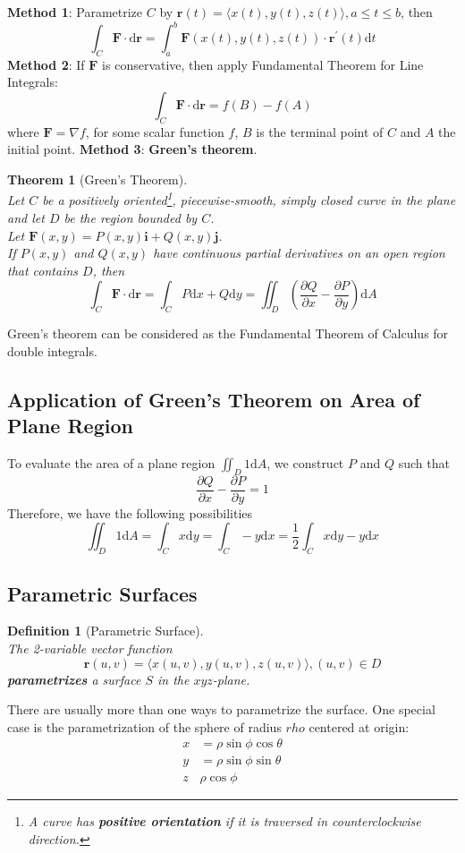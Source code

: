 \documentclass[12pt]{article}
\newtheorem{definition}{Definition}[section]
\newtheorem{theorem}{Theorem}[section]
\theoremstyle{definition}
\newcommand{\diff}{\mathrm{d}}
\begin{document}
\textbf{Method 1}: Parametrize $C$ by $\mathbf{r}(t) = \langle x(t), y(t), z(t)\rangle, a\leq t\leq b$, then
\[
\int_C\mathbf{F}\cdot \diff\mathbf{r} = \int_a^b\mathbf{F}(x(t),y(t),z(t))\cdot \mathbf{r}^\prime(t)\diff t
\]
\textbf{Method 2}: If $\mathbf{F}$ is conservative, then apply Fundamental Theorem for  Line Integrals:
\[
\int_C\mathbf{F}\cdot\diff\mathbf{r} = f(B)-f(A)
\]
where $\mathbf{F} = \nabla f$, for some scalar function $f$, $B$ is the terminal point of $C$ and $A$ the initial point.
\textbf{Method 3}: \textbf{Green's theorem}. 
\begin{theorem}[Green's Theorem]
\hfill\\\normalfont Let $C$ be a positively oriented\footnote{A curve has \textbf{positive orientation} if it is traversed in counterclockwise direction.}, piecewise-smooth, simply closed curve in the plane and let $D$ be the region bounded by $C$.\\Let $\mathbf{F}(x,y)= P(x,y)\mathbf{i}+Q(x,y)\mathbf{j}$.\\If $P(x,y)$ and $Q(x,y)$ have continuous partial derivatives on an open region that contains $D$, then
\[
\int_C\mathbf{F}\cdot \diff\mathbf{r} = \int_C P\diff x+Q\diff y =\iint_D\left(\frac{\partial Q}{\partial x}-\frac{\partial P}{\partial y}\right)\diff A
\] 
\end{theorem}
Green's theorem can be considered as the Fundamental Theorem of Calculus for double integrals.
\subsection{Application of Green's Theorem on Area of Plane Region}
To evaluate the area of a plane region $\iint_D 1\diff A$, we construct $P$ and $Q$ such that
\[
\frac{\partial Q}{\partial x}-\frac{\partial P}{\partial y}=1
\]
Therefore, we have the following possibilities
\[
\iint_D 1\diff A = \int_Cx\diff y = \int_C -y\diff x = \frac{1}{2}\int_C x\diff y -y\diff x 
\]
\subsection{Parametric Surfaces}
\begin{definition}[Parametric Surface]\hfill\\\normalfont
The 2-variable vector function
\[
\mathbf{r}(u,v)=\langle x(u,v),y(u,v),z(u,v)\rangle, (u,v)\in D
\]
\textbf{parametrizes} a surface $S$ in the $xyz$-plane.
\end{definition}
There are usually more than one ways to parametrize the surface. One special case is the parametrization of the sphere of radius $rho$ centered at origin:
\begin{align*}
x&=\rho \sin\phi\cos\theta\\
y&=\rho\sin\phi\sin\theta\\
z&\rho\cos\phi
\end{align*}
\end{document}
